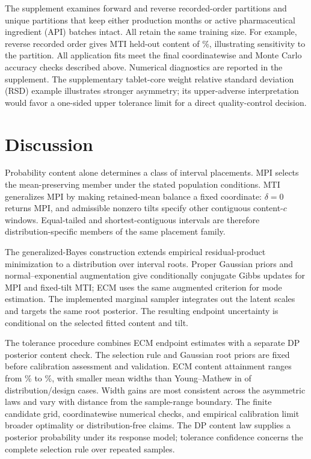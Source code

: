 \documentclass[11pt]{article}
\numberwithin{equation}{section}
\begin{document}
The supplement examines forward and reverse recorded-order partitions and
\PharmaGroupedSplits{} unique partitions that keep either production months
or active pharmaceutical ingredient (API) batches intact. All retain the same
training size. For example, reverse recorded order gives MTI held-out content
of \PharmaTensileReverseContent\%, illustrating sensitivity to the partition.
All application fits meet the final coordinatewise and Monte Carlo accuracy
checks described above. Numerical diagnostics are reported in the supplement.
The supplementary tablet-core weight relative
standard deviation (RSD) example illustrates stronger asymmetry; its
upper-adverse interpretation would favor a one-sided
upper tolerance limit for a direct quality-control decision.


\section{Discussion}
\label{sec:discussion}

Probability content alone determines a class of interval placements. MPI selects
the mean-preserving member under the stated population conditions. MTI
generalizes MPI by making retained-mean balance a fixed coordinate:
\(\delta=0\) returns MPI, and admissible nonzero tilts specify other contiguous
content-\(c\) windows. Equal-tailed and shortest-contiguous intervals are
therefore distribution-specific members of the same placement family.

The generalized-Bayes construction extends empirical residual-product
minimization to a distribution over interval roots. Proper Gaussian priors
and normal--exponential augmentation give conditionally conjugate Gibbs
updates for MPI and fixed-tilt MTI; ECM uses the same augmented criterion
for mode estimation. The implemented marginal sampler integrates out the
latent scales and targets the same root posterior. The resulting endpoint
uncertainty is conditional on the selected fitted content and tilt.

The tolerance procedure combines ECM endpoint estimates with a separate DP
posterior content check. The selection rule and Gaussian root priors are fixed
before calibration assessment and validation. ECM content attainment ranges
from \MTIExpandedECMMin\% to \MTIExpandedECMMax\%, with smaller mean widths than Young--Mathew in
\MTIExpandedECMShorter{} of \MTIExpandedCases{} distribution/design cases. Width gains are most
consistent across the asymmetric laws and vary with distance from the
sample-range boundary. The finite candidate grid, coordinatewise numerical
checks, and empirical calibration limit broader optimality or distribution-free
claims. The DP content law supplies a posterior probability under its response
model; tolerance confidence concerns the complete selection rule over repeated
samples.
\end{document}
